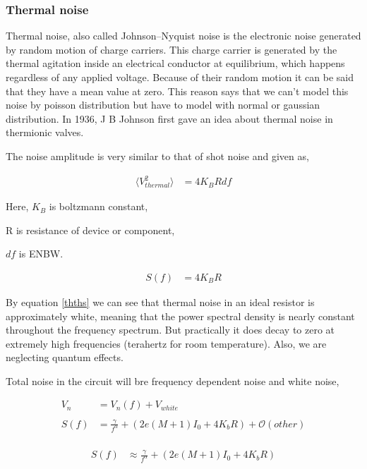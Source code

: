 \documentclass[draft,12pt]{article}
\begin{document}
\subsubsection{Thermal noise \label{thth}}

Thermal noise, also called Johnson–Nyquist noise is the electronic noise generated by random motion of charge carriers. This charge carrier is generated by the thermal agitation inside an electrical conductor at equilibrium, which happens regardless of any applied voltage. Because of their random motion it can be said that they have a mean value at zero. This reason says that we can't model this noise by poisson distribution but have to model with normal or gaussian distribution. In 1936, J B Johnson first gave an idea about thermal noise in thermionic valves. \cite{johnson1928thermal}

The noise amplitude is very similar to that of shot noise and given as,

\begin{align}\label{ththvo}
\langle V_{thermal}^2\rangle & = 4 K_B R df
\end{align}

Here, $K_B$ is boltzmann constant,

R is resistance of device or component,

$df$ is ENBW.

\begin{align}\label{thths}
S(f) & = 4 K_B R
\end{align}

By equation \ref{thths} we can see that thermal noise in an ideal resistor is approximately white, meaning that the power spectral density is nearly constant throughout the frequency spectrum. But practically it does decay to zero at extremely high frequencies (terahertz for room temperature). Also, we are neglecting quantum effects. 


Total noise in the circuit will bre frequency dependent noise and white noise,


\begin{align*}
V_n & = V_{n}(f)+ V_{white}\\
\\
S(f) & = \frac{\gamma}{f^{\alpha}}+(2e(M+1)I_0+4K_bR)+\mathcal{O}(other)\\

\end{align*}

\begin{align}\label{theoryvn}
S(f) & \approx \frac{\gamma}{f^{\alpha}}+(2e(M+1)I_0+4K_bR)
\end{align}
\end{document}
